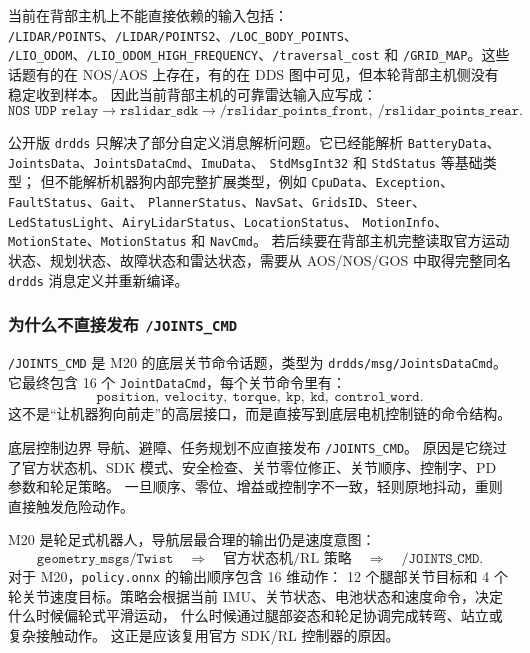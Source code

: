 \documentclass[UTF8,11pt,a4paper]{ctexart}
\begin{document}
当前在背部主机上不能直接依赖的输入包括：
\texttt{/LIDAR/POINTS}、\texttt{/LIDAR/POINTS2}、\texttt{/LOC\_BODY\_POINTS}、
\texttt{/LIO\_ODOM}、\texttt{/LIO\_ODOM\_HIGH\_FREQUENCY}、\texttt{/traversal\_cost} 和
\texttt{/GRID\_MAP}。这些话题有的在 NOS/AOS 上存在，有的在 DDS 图中可见，但本轮背部主机侧没有稳定收到样本。
因此当前背部主机的可靠雷达输入应写成：
\[
\texttt{NOS UDP relay}
\rightarrow
\texttt{rslidar\_sdk}
\rightarrow
\texttt{/rslidar\_points\_front},\ \texttt{/rslidar\_points\_rear}.
\]

公开版 \texttt{drdds} 只解决了部分自定义消息解析问题。它已经能解析
\texttt{BatteryData}、\texttt{JointsData}、\texttt{JointsDataCmd}、\texttt{ImuData}、
\texttt{StdMsgInt32} 和 \texttt{StdStatus} 等基础类型；
但不能解析机器狗内部完整扩展类型，例如
\texttt{CpuData}、\texttt{Exception}、\texttt{FaultStatus}、\texttt{Gait}、
\texttt{PlannerStatus}、\texttt{NavSat}、\texttt{GridsID}、\texttt{Steer}、
\texttt{LedStatusLight}、\texttt{AiryLidarStatus}、\texttt{LocationStatus}、
\texttt{MotionInfo}、\texttt{MotionState}、\texttt{MotionStatus} 和 \texttt{NavCmd}。
若后续要在背部主机完整读取官方运动状态、规划状态、故障状态和雷达状态，需要从 AOS/NOS/GOS 中取得完整同名
\texttt{drdds} 消息定义并重新编译。

\subsubsection{为什么不直接发布 \texttt{/JOINTS\_CMD}}

\texttt{/JOINTS\_CMD} 是 M20 的底层关节命令话题，类型为 \texttt{drdds/msg/JointsDataCmd}。
它最终包含 16 个 \texttt{JointDataCmd}，每个关节命令里有：
\[
\texttt{position},\ \texttt{velocity},\ \texttt{torque},\ \texttt{kp},\ \texttt{kd},\ \texttt{control\_word}.
\]
这不是“让机器狗向前走”的高层接口，而是直接写到底层电机控制链的命令结构。

\begin{redbox}{底层控制边界}
导航、避障、任务规划不应直接发布 \texttt{/JOINTS\_CMD}。
原因是它绕过了官方状态机、SDK 模式、安全检查、关节零位修正、关节顺序、控制字、PD 参数和轮足策略。
一旦顺序、零位、增益或控制字不一致，轻则原地抖动，重则直接触发危险动作。
\end{redbox}

M20 是轮足式机器人，导航层最合理的输出仍是速度意图：
\[
\texttt{geometry\_msgs/Twist}
\quad
\Longrightarrow
\quad
\text{官方状态机/RL 策略}
\quad
\Longrightarrow
\quad
\texttt{/JOINTS\_CMD}.
\]
对于 M20，\texttt{policy.onnx} 的输出顺序包含 16 维动作：
12 个腿部关节目标和 4 个轮关节速度目标。策略会根据当前 IMU、关节状态、电池状态和速度命令，决定什么时候偏轮式平滑运动，
什么时候通过腿部姿态和轮足协调完成转弯、站立或复杂接触动作。
这正是应该复用官方 SDK/RL 控制器的原因。
\end{document}
